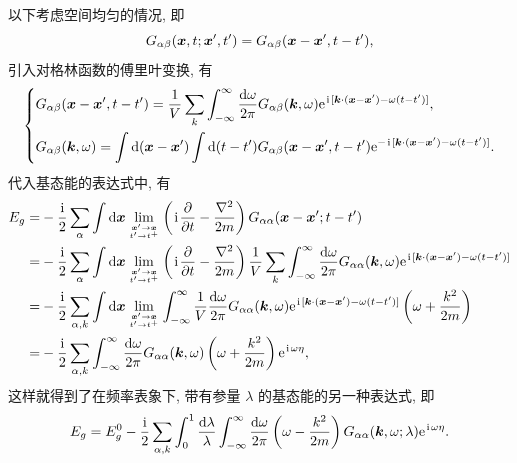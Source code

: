 以下考虑空间均匀的情况, 即
\begin{equation}
    G_{\alpha\beta}(\boldsymbol{x},t;\boldsymbol{x}',t')=G_{\alpha\beta}(\boldsymbol{x}-\boldsymbol{x}',t-t'),
\end{equation}
引入对格林函数的傅里叶变换, 有
\begin{equation}
    \left\{ \begin{aligned}
        &G_{\alpha\beta}(\boldsymbol{x}-\boldsymbol{x}',t-t')=\frac{1}{V}\sum_k\int_{-\infty}^\infty\frac{\mathrm{d}\omega}{2\pi}G_{\alpha\beta}(\boldsymbol{k},\omega)\mathrm{e}^{\hspace{0.1em}\mathrm{i}\hspace{0.1em}[\boldsymbol{k}\cdot(\boldsymbol{x}-\boldsymbol{x}')-\omega(t-t')]},\\
        &G_{\alpha\beta}(\boldsymbol{k},\omega)=\int\mathrm{d}(\boldsymbol{x}-\boldsymbol{x}')\int\mathrm{d}(t-t')G_{\alpha\beta}(\boldsymbol{x}-\boldsymbol{x}',t-t')\mathrm{e}^{-\hspace{0.1em}\mathrm{i}\hspace{0.1em}[\boldsymbol{k}\cdot(\boldsymbol{x}-\boldsymbol{x}')-\omega(t-t')]}.
    \end{aligned} \right.
\end{equation}
代入基态能的表达式中, 有
 \begin{align}
        E_g=&-\frac{\hspace{0.1em}\mathrm{i}\hspace{0.1em}}{2}\sum_\alpha\int\mathrm{d}\boldsymbol{x}\lim_{\boldsymbol{x}'\to \boldsymbol{x}\atop t'\to t^+}\left( \hspace{0.1em}\mathrm{i}\hspace{0.1em}\frac{\partial}{\partial t}-\frac{\nabla^2}{2m} \right) G_{\alpha\alpha}(\boldsymbol{x}-\boldsymbol{x}';t-t')\nonumber\\
        =&-\frac{\hspace{0.1em}\mathrm{i}\hspace{0.1em}}{2}\sum_{\alpha}\int\mathrm{d} \boldsymbol{x}\lim_{\boldsymbol{x}'\to\boldsymbol{x}\atop t'\to t^+}\left( \hspace{0.1em}\mathrm{i}\hspace{0.1em}\frac{\partial}{\partial t}-\frac{\nabla^2}{2m} \right) \frac{1}{V}\sum_{k}\int_{-\infty}^{\infty}\frac{\mathrm{d}\omega}{2\pi}G_{\alpha\alpha}(\boldsymbol{k},\omega)\mathrm{e}^{\hspace{0.1em}\mathrm{i}\hspace{0.1em}[\boldsymbol{k}\cdot(\boldsymbol{x}-\boldsymbol{x}')-\omega(t-t')]}\nonumber\\
        =&-\frac{\hspace{0.1em}\mathrm{i}\hspace{0.1em}}{2}\sum_{\alpha,k}\int\mathrm{d}\boldsymbol{x}\lim_{\boldsymbol{x}'\to\boldsymbol{x}\atop t'\to t^+}\int_{-\infty}^{\infty}\frac{1}{V}\frac{\mathrm{d}\omega}{2\pi}G_{\alpha\alpha}(\boldsymbol{k},\omega)\mathrm{e}^{\hspace{0.1em}\mathrm{i}\hspace{0.1em}[\boldsymbol{k}\cdot(\boldsymbol{x}-\boldsymbol{x}')-\omega(t-t')]}\left( \omega+\frac{k^2}{2m} \right)\nonumber\\
        =&-\frac{\hspace{0.1em}\mathrm{i}\hspace{0.1em}}{2}\sum_{\alpha,k}\int_{-\infty}^{\infty}\frac{\mathrm{d}\omega}{2\pi}G_{\alpha\alpha}(\boldsymbol{k},\omega)\left( \omega+\frac{k^2}{2m} \right)\mathrm{e}^{\hspace{0.1em}\mathrm{i}\hspace{0.1em}\omega\eta},
    \end{align}
这样就得到了在频率表象下, 带有参量 $\lambda$ 的基态能的另一种表达式, 即
\begin{equation}
    E_g=E_g^0-\frac{\hspace{0.1em}\mathrm{i}\hspace{0.1em}}{2}\sum_{\alpha,k}\int_0^1\frac{\mathrm{d}\lambda}{\lambda}\int_{-\infty}^{\infty}\frac{\mathrm{d}\omega}{2\pi}\left( \omega-\frac{k^2}{2m} \right) G_{\alpha\alpha}(\boldsymbol{k},\omega;\lambda)\mathrm{e}^{\hspace{0.1em}\mathrm{i}\hspace{0.1em}\omega\eta}.
\end{equation}


